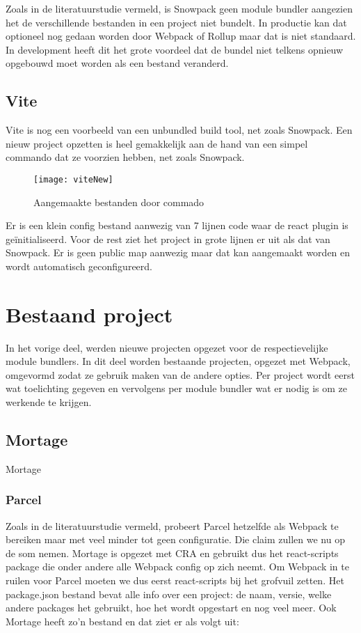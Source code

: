Zoals in de literatuurstudie vermeld, is Snowpack geen module bundler aangezien het de verschillende bestanden in een project niet bundelt. In productie kan dat optioneel nog gedaan worden door Webpack of Rollup maar dat is niet standaard. In development heeft dit het grote voordeel dat de bundel niet telkens opnieuw opgebouwd moet worden als een bestand veranderd. 

\subsection{Vite}
Vite is nog een voorbeeld van een unbundled build tool, net zoals Snowpack. Een nieuw project opzetten is heel gemakkelijk aan de hand van een simpel commando dat ze voorzien hebben, net zoals Snowpack. 



\begin{figure}[h]
    \texttt{[image: viteNew]}
        \centering
        \caption[Aangemaakte bestanden door Vite commando]{Aangemaakte bestanden door commado}
    \end{figure}

Er is een klein config bestand aanwezig van 7 lijnen code waar de react plugin is geïnitialiseerd. Voor de rest ziet het project in grote lijnen er uit als dat van Snowpack. Er is geen public map aanwezig maar dat kan aangemaakt worden en wordt automatisch geconfigureerd.

\section{Bestaand project}
In het vorige deel, werden nieuwe projecten opgezet voor de respectievelijke module bundlers. In dit deel worden bestaande projecten, opgezet met Webpack, omgevormd zodat ze gebruik maken van de andere opties. Per project wordt eerst wat toelichting gegeven en vervolgens per module bundler wat er nodig is om ze werkende te krijgen. 

\subsection{Mortage}
Mortage \autocite{houghton-2019}

\subsubsection{Parcel}
Zoals in de literatuurstudie vermeld, probeert Parcel hetzelfde als Webpack te bereiken maar met veel minder tot geen configuratie. Die claim zullen we nu op de som nemen. Mortage is opgezet met CRA en gebruikt dus het react-scripts package die onder andere alle Webpack config op zich neemt. Om Webpack in te ruilen voor Parcel moeten we dus eerst react-scripts bij het grofvuil zetten. Het package.json bestand bevat alle info over een project: de naam, versie, welke andere packages het gebruikt, hoe het wordt opgestart en nog veel meer. Ook Mortage heeft zo’n bestand en dat ziet er als volgt uit:



